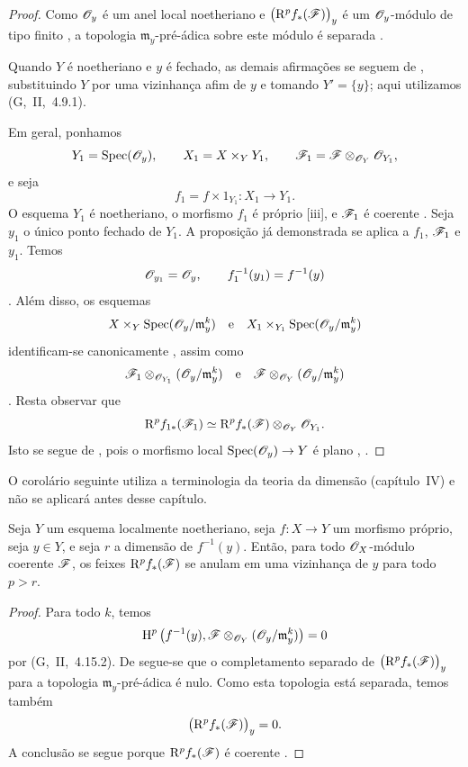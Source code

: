 \begin{proof}
Como $\mathscr{O}_y$ é um anel local noetheriano e
$\bigl(\mathrm{R}^p f_*(\mathscr{F})\bigr)_y$ é um $\mathscr{O}_y$-módulo de tipo
finito , a topologia $\mathfrak{m}_y$-pré-ádica sobre
este módulo é separada .

Quando $Y$ é noetheriano e $y$ é fechado, as demais afirmações se
seguem de , substituindo $Y$ por uma vizinhança afim de
$y$ e tomando $Y'=\{y\}$; aqui utilizamos (G,~II,~4.9.1).

Em geral, ponhamos
\[
  Y_1=\operatorname{Spec}(\mathscr{O}_y),
  \qquad
  X_1=X\times_Y Y_1,
  \qquad
  \mathscr{F}_1
  =
  \mathscr{F}\otimes_{\mathscr{O}_Y}\mathscr{O}_{Y_1},
\]
e seja
\[
  f_1=f\times 1_{Y_1}:X_1\longrightarrow Y_1.
\]
O esquema $Y_1$ é noetheriano, o morfismo $f_1$ é próprio
[iii], e $\mathscr{F}_1$ é coerente
.
Seja $y_1$ o único ponto fechado de $Y_1$.
A proposição já demonstrada se aplica a $f_1$, $\mathscr{F}_1$ e
$y_1$.
Temos
\[
  \mathscr{O}_{y_1}=\mathscr{O}_y,
  \qquad
  f_1^{-1}(y_1)=f^{-1}(y)
\]
.
Além disso, os esquemas
\[
  X\times_Y\operatorname{Spec}(\mathscr{O}_y/\mathfrak{m}_y^k)
  \quad\text{e}\quad
  X_1\times_{Y_1}\operatorname{Spec}(\mathscr{O}_y/\mathfrak{m}_y^k)
\]
identificam-se canonicamente , assim como
\[
  \mathscr{F}_1
  \otimes_{\mathscr{O}_{Y_1}}
  (\mathscr{O}_y/\mathfrak{m}_y^k)
  \quad\text{e}\quad
  \mathscr{F}
  \otimes_{\mathscr{O}_Y}
  (\mathscr{O}_y/\mathfrak{m}_y^k)
\]
.
Resta observar que
\[
  \mathrm{R}^p f_{1*}(\mathscr{F}_1)
  \simeq
  \mathrm{R}^p f_*(\mathscr{F})
  \otimes_{\mathscr{O}_Y}
  \mathscr{O}_{Y_1}.
\]
Isto se segue de , pois o morfismo local
$\Spec(\sh{O}_y)\to Y$ é plano
, .
\end{proof}

O corolário seguinte utiliza a terminologia da teoria da
dimensão (capítulo~IV) e não se aplicará antes desse capítulo.

\begin{corollary}[4.2.2]
\label{III.4.2.2}
Seja $Y$ um esquema localmente noetheriano, seja $f:X\to Y$ um
morfismo próprio, seja $y\in Y$, e seja $r$ a dimensão de
$f^{-1}(y)$.
Então, para todo $\mathscr{O}_X$-módulo coerente $\mathscr{F}$, os feixes
$\mathrm{R}^p f_*(\mathscr{F})$ se anulam em uma vizinhança de $y$ para todo
$p>r$.
\end{corollary}

\begin{proof}
Para todo $k$, temos
\[
  \mathrm{H}^p\left(
    f^{-1}(y),
    \mathscr{F}\otimes_{\mathscr{O}_Y}
    (\mathscr{O}_y/\mathfrak{m}_y^k)
  \right)
  =
  0
\]
por (G,~II,~4.15.2).
De  segue-se que o completamento separado de
$\bigl(\mathrm{R}^p f_*(\mathscr{F})\bigr)_y$ para a topologia
$\mathfrak{m}_y$-pré-ádica é nulo.
Como esta topologia está separada, temos também
\[
  \bigl(\mathrm{R}^p f_*(\mathscr{F})\bigr)_y=0.
\]
A conclusão se segue porque $\mathrm{R}^p f_*(\mathscr{F})$ é coerente
.
\end{proof}

